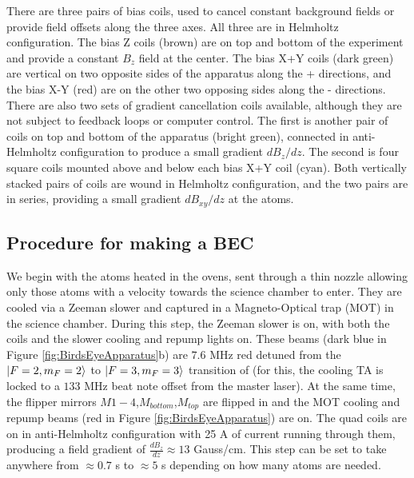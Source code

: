 There are three pairs of bias coils, used to cancel constant background fields or provide field offsets along the three axes. All three are in Helmholtz configuration. The bias Z coils (brown) are on top and bottom of the experiment and provide a constant $B_z$ field at the center. The bias X+Y coils (dark green) are vertical on two opposite sides of the apparatus along the \ex{}+\ey{} directions, and the bias X-Y (red) are on the other two opposing sides along the \ex{}-\ey{} directions. There are also two sets of gradient cancellation coils available, although they are not subject to feedback loops or computer control. The first is another pair of coils on top and bottom of the apparatus (bright green), connected in anti-Helmholtz configuration to produce a small gradient $dB_z/dz$. The second is four square coils mounted above and below each bias X+Y coil (cyan). Both vertically stacked pairs of coils are wound in Helmholtz configuration, and the two pairs are in series, providing a small gradient $dB_{xy}/dz$ at the atoms.  


\subsection{Procedure for making a BEC}\label{sec:BECsequence}

We begin with the atoms heated in the ovens, sent through a thin nozzle allowing only those atoms with a velocity towards the science chamber to enter. They are cooled via a Zeeman slower and captured in a Magneto-Optical trap (MOT) in the science chamber. During this step, the Zeeman slower is on, with both the coils and the slower cooling and repump lights on. These beams (dark blue in Figure \ref{fig:BirdsEyeApparatus}b) are $7.6$ MHz red detuned from the $\mathinner{|{F=2,m_F=2}\rangle}$ to $\mathinner{|{F=3,m_F=3}\rangle}$ transition of \Rb{} (for this, the cooling TA is locked to a $133$ MHz beat note offset from the master laser). At the same time, the flipper mirrors $M1-4$,$M_{bottom}$,$M_{top}$ are flipped in and the MOT cooling and repump beams (red in Figure \ref{fig:BirdsEyeApparatus}) are on. The quad coils are on in anti-Helmholtz configuration with 25 A of current running through them, producing a field gradient of $\frac{dB_z}{dz}\approx13$ Gauss/cm. This step can be set to take anywhere from $\approx0.7$ s to $\approx5$ s depending on how many atoms are needed.  

